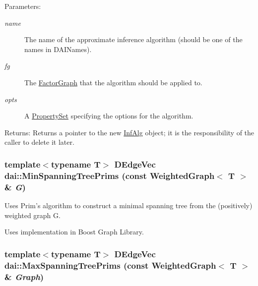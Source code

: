 \begin{Desc}
\item[Parameters:]
\begin{description}
\item[{\em name}]The name of the approximate inference algorithm (should be one of the names in DAINames). \item[{\em fg}]The \hyperlink{classdai_1_1FactorGraph}{FactorGraph} that the algorithm should be applied to. \item[{\em opts}]A \hyperlink{classdai_1_1PropertySet}{PropertySet} specifying the options for the algorithm. \end{description}
\end{Desc}
\begin{Desc}
\item[Returns:]Returns a pointer to the new \hyperlink{classdai_1_1InfAlg}{InfAlg} object; it is the responsibility of the caller to delete it later. \end{Desc}
\hypertarget{namespacedai_7ede01daa445869cce29730d0cc29d74}{
\subsubsection[MinSpanningTreePrims]{\setlength{\rightskip}{0pt plus 5cm}template$<$typename T$>$ {\bf DEdgeVec} dai::MinSpanningTreePrims (const WeightedGraph$<$ T $>$ \& {\em G})}}
\label{namespacedai_7ede01daa445869cce29730d0cc29d74}


Uses Prim's algorithm to construct a minimal spanning tree from the (positively) weighted graph G. 

Uses implementation in Boost Graph Library. \hypertarget{namespacedai_461d882462bc6625c3874e1481fd9d68}{
\subsubsection[MaxSpanningTreePrims]{\setlength{\rightskip}{0pt plus 5cm}template$<$typename T$>$ {\bf DEdgeVec} dai::MaxSpanningTreePrims (const WeightedGraph$<$ T $>$ \& {\em Graph})}}
\label{namespacedai_461d882462bc6625c3874e1481fd9d68}


